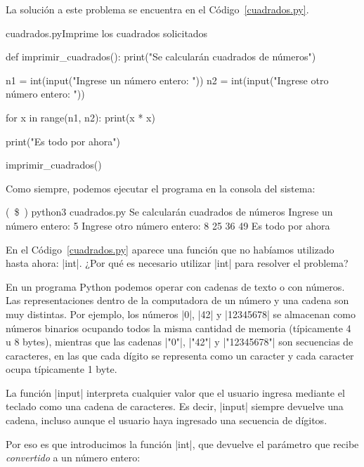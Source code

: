 \begin{solucion}
La solución a este problema se encuentra en el Código~\ref{cuadrados.py}.

\begin{codigo}{cuadrados.py}{Imprime los cuadrados solicitados}
\label{cuadrados.py}
\begin{codigo-python}
def imprimir_cuadrados():
    print("Se calcularán cuadrados de números")

    n1 = int(input("Ingrese un número entero: "))
    n2 = int(input("Ingrese otro número entero: "))

    for x in range(n1, n2):
        print(x * x)

    print("Es todo por ahora")

imprimir_cuadrados()
\end{codigo-python}
\end{codigo}

Como siempre, podemos ejecutar el programa en la consola del sistema:

\begin{codigo-nohl-sn}
(~\$~) python3 cuadrados.py
Se calcularán cuadrados de números
Ingrese un número entero: 5
Ingrese otro número entero: 8
25
36
49
Es todo por ahora
\end{codigo-nohl-sn}
\end{solucion}

En el Código~\ref{cuadrados.py} aparece una función que no habíamos
utilizado hasta ahora: |int|. ¿Por qué es necesario utilizar |int| para
resolver el problema?

En un programa Python podemos operar con cadenas de texto o con números.  Las
representaciones dentro de la computadora de un número y una cadena son muy
distintas. Por ejemplo, los números |0|, |42| y |12345678| se almacenan
como números binarios ocupando todos la misma cantidad de memoria (típicamente
4 u 8 bytes), mientras que las cadenas |"0"|, |"42"| y |"12345678"| son
secuencias de caracteres, en las que cada dígito se representa como un
caracter y cada caracter ocupa típicamente 1 byte.

La función |input| interpreta cualquier valor que el usuario ingresa mediante
el teclado como una cadena de caracteres. Es decir, |input| siempre devuelve
una cadena, incluso aunque el usuario haya ingresado una secuencia de dígitos.

Por eso es que introducimos la función |int|, que devuelve el parámetro que
recibe \emph{convertido} a un número entero:

